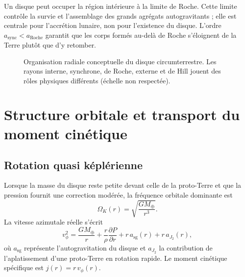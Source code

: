 \documentclass[11pt,a4paper,openany]{report}
\newcommand{\Mt}{M_{\oplus}}
\newcommand{\aR}{a_{\mathrm{Roche}}}
\begin{document}
\begin{lecture}
Un disque peut occuper la région intérieure à la limite de Roche. Cette limite contrôle la survie
et l'assemblage des grands agrégats autogravitants ; elle est centrale pour l'accrétion lunaire,
non pour l'existence du disque. L'ordre $a_{\mathrm{sync}}<\aR$ garantit que les corps formés
au-delà de Roche s'éloignent de la Terre plutôt que d'y retomber.
\end{lecture}

\begin{figure}[htbp]
\centering
{}
\caption{Organisation radiale conceptuelle du disque circumterrestre. Les rayons interne,
synchrone, de Roche, externe et de Hill jouent des rôles physiques différents (échelle non
respectée).}
\label{fig:radial}
\end{figure}


\section{Structure orbitale et transport du moment cinétique}
\subsection{Rotation quasi képlérienne}

Lorsque la masse du disque reste petite devant celle de la proto-Terre et que la pression fournit
une correction modérée, la fréquence orbitale dominante est
\begin{equation}
\Omega_K(r)=\sqrt{\frac{G\Mt}{r^3}}.
\label{eq:OmegaK}
\end{equation}
La vitesse azimutale réelle s'écrit
\begin{equation}
v_\phi^2=\frac{G\Mt}{r}+\frac{r}{\rho}\frac{\partial P}{\partial r}+r\,a_{\mathrm{sg}}(r)
+r\,a_{J_2}(r),
\label{eq:vphi}
\end{equation}
où $a_{\mathrm{sg}}$ représente l'autogravitation du disque et $a_{J_2}$ la contribution de
l'aplatissement d'une proto-Terre en rotation rapide. Le moment cinétique spécifique est
$j(r)=r\,v_\phi(r)$.
\end{document}
